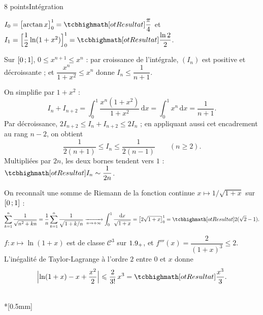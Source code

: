 \begin{corrigeEval}{8 points}{Intégration}
\begin{questions}
  \item $I_0=\bigl[\arctan x\bigr]_0^{1}=\res{\dfrac\pi4}$ et
    $I_1=\Bigl[\dfrac12\ln(1+x^{2})\Bigr]_0^{1}=\res{\dfrac{\ln2}{2}}$.
    \pts{1 pt}
  \item Sur $\mathopen{[}0\,{;}\,1\mathclose{]}$, $0\leqslant x^{n+1}\leqslant x^{n}$ : par
    croissance de l'intégrale, $(I_n)$ est positive et décroissante ; et
    $\dfrac{x^{n}}{1+x^{2}}\leqslant x^{n}$ donne
    $I_n\leqslant\dfrac{1}{n+1}$. 
  \item On simplifie par $1+x^{2}$ :
    \[I_n+I_{n+2}=\int_0^{1}\frac{x^{n}(1+x^{2})}{1+x^{2}}\,\mathrm{d}x
      =\int_0^{1}x^{n}\,\mathrm{d}x=\frac{1}{n+1}.\]
    Par décroissance, $2I_{n+2}\leqslant I_n+I_{n+2}\leqslant2I_n$ ; en
    appliquant aussi cet encadrement au rang $n-2$, on obtient
    \[\frac{1}{2(n+1)}\leqslant I_n\leqslant\frac{1}{2(n-1)}\qquad(n\geqslant2).\]
    Multipliées par $2n$, les deux bornes tendent vers $1$ :
    $\res{I_n\sim\dfrac{1}{2n}}$. 
  \item On reconnaît une somme de Riemann de la fonction continue
    $x\mapsto1/\sqrt{1+x}$ sur $\mathopen{[}0\,{;}\,1\mathclose{]}$ :
    \[\sum_{k=1}^{n}\frac{1}{\sqrt{n^{2}+kn}}
      =\frac1n\sum_{k=1}^{n}\frac{1}{\sqrt{1+k/n}}
      \xrightarrow[n\to+\infty]{}\int_0^{1}\frac{\mathrm{d}x}{\sqrt{1+x}}
      =\bigl[2\sqrt{1+x}\bigr]_0^{1}=\res{2(\sqrt2-1)}.\]
  \item $f:x\mapsto\ln(1+x)$ est de classe $\mathcal{C}^{3}$ sur $1.9_{+}$,
    et $f'''(x)=\dfrac{2}{(1+x)^{3}}\leqslant2$. L'inégalité de
    Taylor-Lagrange à l'ordre $2$ entre $0$ et $x$ donne
    \[\Bigl|\ln(1+x)-x+\frac{x^{2}}{2}\Bigr|\leqslant\frac{2}{3!}\,x^{3}
      =\res{\frac{x^{3}}{3}}.\]
\end{questions}
\begin{center}\begin{minipage}{\linewidth}\centering
{}\\*[0.5mm]
\end{minipage}\end{center}
\end{corrigeEval}

